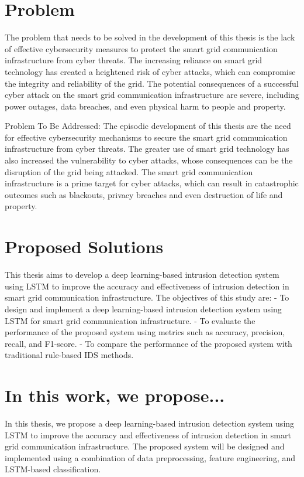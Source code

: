 \section*{Problem}
The problem that needs to be solved in the development of this thesis is the lack of effective cybersecurity measures to protect the smart grid communication infrastructure from cyber threats. The increasing reliance on smart grid technology has created a heightened risk of cyber attacks, which can compromise the integrity and reliability of the grid. The potential consequences of a successful cyber attack on the smart grid communication infrastructure are severe, including power outages, data breaches, and even physical harm to people and property.

Problem To Be Addressed: The episodic development of this thesis are the need for effective cybersecurity mechanisms to secure the smart grid communication infrastructure from cyber threats. The greater use of smart grid technology has also increased the vulnerability to cyber attacks, whose consequences can be the disruption of the grid being attacked. The smart grid communication infrastructure is a prime target for cyber attacks, which can result in catastrophic outcomes such as blackouts, privacy breaches and even destruction of life and property.




\section*{Proposed Solutions}
This thesis aims to develop a deep learning-based intrusion detection system using LSTM to improve the accuracy and effectiveness of intrusion detection in smart grid communication infrastructure. The objectives of this study are:
 - To design and implement a deep learning-based intrusion detection system using LSTM for smart grid communication infrastructure.
 - To evaluate the performance of the proposed system using metrics such as accuracy, precision, recall, and F1-score.
 - To compare the performance of the proposed system with traditional rule-based IDS methods.


\section*{In this work, we propose...}
In this thesis, we propose a deep learning-based intrusion detection system using LSTM to improve the accuracy and effectiveness of intrusion detection in smart grid communication infrastructure. The proposed system will be designed and implemented using a combination of data preprocessing, feature engineering, and LSTM-based classification.


